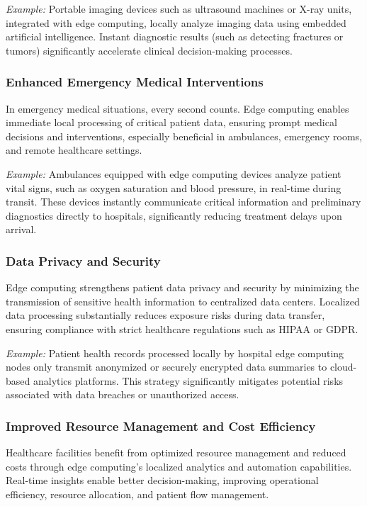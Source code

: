 \documentclass[runningheads]{llncs}
\begin{document}
\textit{Example:} Portable imaging devices such as ultrasound machines or X-ray units, integrated with edge computing, locally analyze imaging data using embedded artificial intelligence. Instant diagnostic results (such as detecting fractures or tumors) significantly accelerate clinical decision-making processes.

\subsubsection{Enhanced Emergency Medical Interventions}
In emergency medical situations, every second counts. Edge computing enables immediate local processing of critical patient data, ensuring prompt medical decisions and interventions, especially beneficial in ambulances, emergency rooms, and remote healthcare settings.

\textit{Example:} Ambulances equipped with edge computing devices analyze patient vital signs, such as oxygen saturation and blood pressure, in real-time during transit. These devices instantly communicate critical information and preliminary diagnostics directly to hospitals, significantly reducing treatment delays upon arrival.

\subsubsection{Data Privacy and Security}
Edge computing strengthens patient data privacy and security by minimizing the transmission of sensitive health information to centralized data centers. Localized data processing substantially reduces exposure risks during data transfer, ensuring compliance with strict healthcare regulations such as HIPAA or GDPR.

\textit{Example:} Patient health records processed locally by hospital edge computing nodes only transmit anonymized or securely encrypted data summaries to cloud-based analytics platforms. This strategy significantly mitigates potential risks associated with data breaches or unauthorized access.

\subsubsection{Improved Resource Management and Cost Efficiency}
Healthcare facilities benefit from optimized resource management and reduced costs through edge computing’s localized analytics and automation capabilities. Real-time insights enable better decision-making, improving operational efficiency, resource allocation, and patient flow management.
\end{document}
